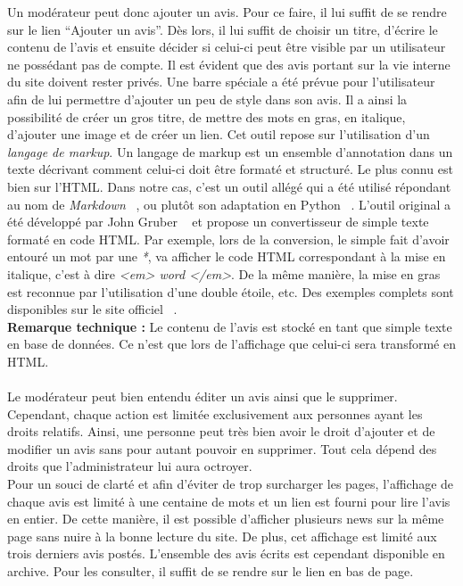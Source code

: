 \documentclass[12pt, a4paper, oneside]{article}
\begin{document}
{{    \indent Un modérateur peut donc ajouter un avis. Pour ce faire, il lui suffit de se rendre sur le lien ``Ajouter un avis''. Dès lors, il lui suffit de choisir un titre, d'écrire le contenu de l'avis et ensuite décider si celui-ci peut être visible par un utilisateur ne possédant pas de compte. Il est évident que des avis portant sur la vie interne du site doivent rester privés. Une barre spéciale a été prévue pour l'utilisateur afin de lui permettre d'ajouter un peu de style dans son avis. Il a ainsi la possibilité de créer un gros titre, de mettre des mots en gras, en italique, d'ajouter une image et de créer un lien. Cet outil repose sur l'utilisation d'un \textit{langage de markup}. Un langage de markup est un ensemble d'annotation dans un texte décrivant comment celui-ci doit être formaté et structuré. Le plus connu est bien sur l'HTML. Dans notre cas, c'est un outil allégé qui a été utilisé répondant au nom de \textit{Markdown} ~\cite{Markdown}, ou plutôt son adaptation en Python ~\cite{Markdow-python}. L'outil original a été développé par John Gruber ~\cite{john-gruber} et propose un convertisseur de simple texte formaté en code HTML. Par exemple, lors de la conversion, le simple fait d'avoir entouré un mot par une \textit{*}, va afficher le code HTML correspondant à la mise en italique, c'est à dire \textit{<em> word </em>}. De la même manière, la mise en gras est reconnue par l'utilisation d'une double étoile, etc. Des exemples complets sont disponibles sur le site officiel ~\cite{markdown-basics}. \\
    \textbf{Remarque technique :} Le contenu de l'avis est stocké en tant que simple texte en base de données. Ce n'est que lors de l'affichage que celui-ci sera transformé en HTML.\\\\
    \indent Le modérateur peut bien entendu éditer un avis ainsi que le supprimer. Cependant, chaque action est limitée exclusivement aux personnes ayant les droits relatifs. Ainsi, une personne peut très bien avoir le droit d'ajouter et de modifier un avis sans pour autant pouvoir en supprimer. Tout cela dépend des droits que l'administrateur lui aura octroyer.\\
    \indent Pour un souci de clarté et afin d'éviter de trop surcharger les pages, l'affichage de chaque avis est limité à une centaine de mots et un lien est fourni pour lire l'avis en entier. De cette manière, il est possible d'afficher plusieurs news sur la même page sans nuire à la bonne lecture du site. De plus, cet affichage est limité aux trois derniers avis postés. L'ensemble des avis écrits est cependant disponible en archive. Pour les consulter, il suffit de se rendre sur le lien en bas de page.
}}
\end{document}
